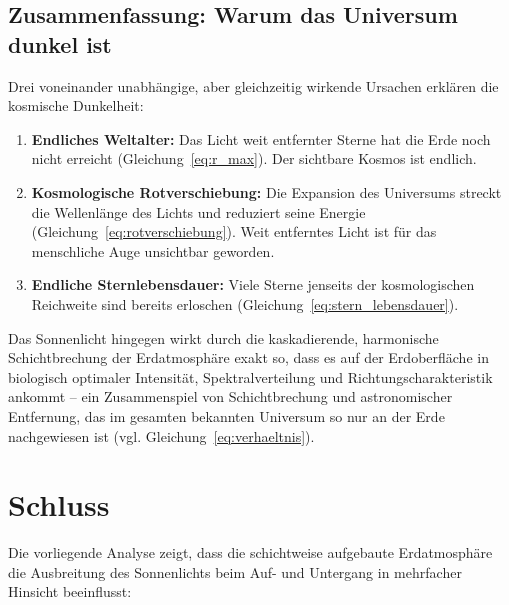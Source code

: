 \documentclass[12pt,a4paper]{article}
\begin{document}
\subsection{Zusammenfassung: Warum das Universum dunkel ist}

Drei voneinander unabhängige, aber gleichzeitig wirkende
Ursachen erklären die kosmische Dunkelheit:

\begin{enumerate}
  \item \textbf{Endliches Weltalter:}
        Das Licht weit entfernter Sterne hat die Erde noch nicht
        erreicht (Gleichung~\ref{eq:r_max}).
        Der sichtbare Kosmos ist endlich.

  \item \textbf{Kosmologische Rotverschiebung:}
        Die Expansion des Universums streckt die Wellenlänge
        des Lichts und reduziert seine Energie
        (Gleichung~\ref{eq:rotverschiebung}).
        Weit entferntes Licht ist für das menschliche Auge
        unsichtbar geworden.

  \item \textbf{Endliche Sternlebensdauer:}
        Viele Sterne jenseits der kosmologischen Reichweite
        sind bereits erloschen (Gleichung~\ref{eq:stern_lebensdauer}).
\end{enumerate}

Das Sonnenlicht hingegen wirkt durch die kaskadierende,
harmonische Schichtbrechung der Erdatmosphäre exakt so,
dass es auf der Erdoberfläche in biologisch optimaler Intensität,
Spektralverteilung und Richtungscharakteristik ankommt --
ein Zusammenspiel von Schichtbrechung und astronomischer Entfernung,
das im gesamten bekannten Universum so nur an der Erde nachgewiesen ist
(vgl. Gleichung~\ref{eq:verhaeltnis}).

\section{Schluss}
\label{sec:schluss}

Die vorliegende Analyse zeigt, dass die schichtweise aufgebaute
Erdatmosphäre die Ausbreitung des Sonnenlichts beim Auf- und
Untergang in mehrfacher Hinsicht beeinflusst:
\end{document}
